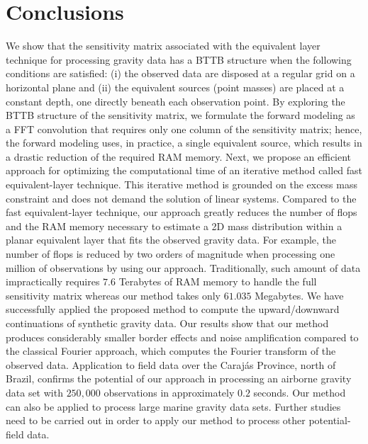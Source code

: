 \section{Conclusions}

We show that the sensitivity matrix associated with the equivalent layer technique 
for processing gravity data has a BTTB structure when the following conditions are
satisfied: (i) the observed data are disposed at a regular grid on a horizontal plane
and (ii) the equivalent sources (point masses) are placed at a constant depth, one directly 
beneath each observation point.
By exploring the BTTB structure of the sensitivity matrix, we formulate the forward modeling as a 
FFT convolution that requires only one column of the sensitivity matrix; 
hence, the forward modeling uses, in practice, a single equivalent source,
which results in a drastic reduction of the required RAM memory. 
Next, we propose an efficient approach for optimizing the computational time of an 
iterative method called fast equivalent-layer technique.
This iterative method is grounded on the excess mass constraint and does not demand the solution of 
linear systems.
Compared to the fast equivalent-layer technique, 
our approach greatly reduces the number of flops and the RAM memory necessary to estimate a 
2D mass distribution within a planar equivalent layer that fits the observed gravity data. 
For example, the number of flops is reduced by two orders 
of magnitude when processing one million of observations by using our approach. 
Traditionally, such amount of data impractically requires $7.6$ Terabytes of RAM memory to handle 
the full sensitivity matrix whereas our method takes only $61.035$ Megabytes.
We have successfully applied the proposed method to compute the upward/downward continuations of 
synthetic gravity data. 
Our results show that our method produces considerably smaller border effects and 
noise amplification compared to the classical Fourier approach, 
which computes the Fourier transform of the observed data.
Application to field data over the Caraj{\'a}s Province, north of Brazil, 
confirms the potential of our approach in processing an airborne gravity data set with $250,000$ observations in approximately $0.2$ seconds. 
Our method can also be applied to process large marine gravity data sets. 
Further studies need to be carried out in order to apply our method to process 
other potential-field data.